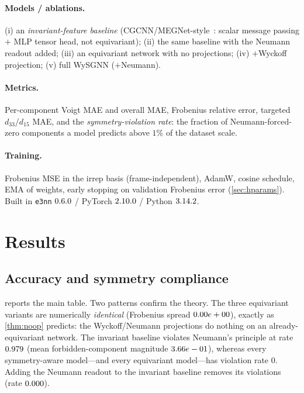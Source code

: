 \documentclass[11pt]{article}
\begin{document}
\paragraph{Models / ablations.}
(i) an \emph{invariant-feature baseline} (CGCNN/MEGNet-style~\cite{cgcnn2018,
megnet2019}: scalar message passing $+$ MLP tensor head, not equivariant);
(ii) the same baseline with the Neumann readout added; (iii) an equivariant
network with no projections; (iv) $+$Wyckoff projection; (v) full WySGNN
($+$Neumann).

\paragraph{Metrics.}
Per-component Voigt MAE and overall MAE, Frobenius relative error, targeted
$d_{33}$/$d_{15}$ MAE, and the \emph{symmetry-violation rate}: the fraction of
Neumann-forced-zero components a model predicts above $1\%$ of the dataset scale.

\paragraph{Training.}
Frobenius MSE in the irrep basis (frame-independent), AdamW, cosine schedule, EMA
of weights, early stopping on validation Frobenius error
(\cref{sec:hparams}). Built in \texttt{e3nn} $0.6.0$ / PyTorch
$2.10.0$ / Python $3.14.2$.

\section{Results}
\subsection{Accuracy and symmetry compliance}
 reports the main table. Two patterns confirm the theory. The
three equivariant variants are numerically \emph{identical} (Frobenius spread
$0.00e+00$), exactly as \cref{thm:noop} predicts: the Wyckoff/Neumann
projections do nothing on an already-equivariant network. The invariant baseline
violates Neumann's principle at rate $0.979$ (mean forbidden-component
magnitude $3.66e-01$), whereas every symmetry-aware model---and every equivariant
model---has violation rate $0$. Adding the Neumann readout to the invariant
baseline removes its violations (rate $0.000$).

\begin{table}[t]
\centering
\caption{Ablation on the test split. Equivariant variants coincide
(\cref{thm:noop}); only the invariant baseline violates Neumann's principle.
All numbers from \texttt{eval.py} (config hash \texttt{\configHash}).}
\label{tab:ablation}
\small

\end{table}
\end{document}
